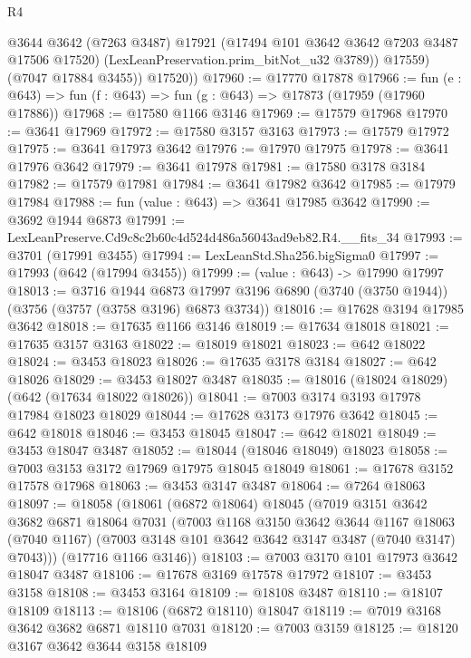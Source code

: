 \begin{lexlean}{R4}
\begin{coremodule}
              @3644
              @3642
              (@7263 @3487)
              @17921
              (@17494 @101 @3642 @3642 @7203 @3487 @17506 @17520)
              (LexLeanPreservation.prim_bitNot_u32 @3789))
            @17559)
          (@7047 @17884 @3455))
        @17520))
@17960 := @17770 @17878
@17966 := fun (e : @643) => fun (f : @643) => fun (g : @643) => @17873 (@17959 (@17960 @17886))
@17968 := @17580 @1166 @3146
@17969 := @17579 @17968
@17970 := @3641 @17969
@17972 := @17580 @3157 @3163
@17973 := @17579 @17972
@17975 := @3641 @17973 @3642
@17976 := @17970 @17975
@17978 := @3641 @17976 @3642
@17979 := @3641 @17978
@17981 := @17580 @3178 @3184
@17982 := @17579 @17981
@17984 := @3641 @17982 @3642
@17985 := @17979 @17984
@17988 := fun (value : @643) => @3641 @17985 @3642
@17990 := @3692 @1944 @6873
@17991 := LexLeanPreserve.Cd9c8c2b60c4d524d486a56043ad9eb82.R4.__fits_34
@17993 := @3701 (@17991 @3455)
@17994 := LexLeanStd.Sha256.bigSigma0
@17997 := @17993 (@642 (@17994 @3455))
@17999 := (value : @643) -> @17990 @17997
@18013 := @3716
    @1944
    @6873
    @17997
    @3196
    @6890
    (@3740 (@3750 @1944))
    (@3756 (@3757 (@3758 @3196) @6873 @3734))
@18016 := @17628 @3194 @17985 @3642
@18018 := @17635 @1166 @3146
@18019 := @17634 @18018
@18021 := @17635 @3157 @3163
@18022 := @18019 @18021
@18023 := @642 @18022
@18024 := @3453 @18023
@18026 := @17635 @3178 @3184
@18027 := @642 @18026
@18029 := @3453 @18027 @3487
@18035 := @18016 (@18024 @18029) (@642 (@17634 @18022 @18026))
@18041 := @7003 @3174 @3193 @17978 @17984 @18023 @18029
@18044 := @17628 @3173 @17976 @3642
@18045 := @642 @18018
@18046 := @3453 @18045
@18047 := @642 @18021
@18049 := @3453 @18047 @3487
@18052 := @18044 (@18046 @18049) @18023
@18058 := @7003 @3153 @3172 @17969 @17975 @18045 @18049
@18061 := @17678 @3152 @17578 @17968
@18063 := @3453 @3147 @3487
@18064 := @7264 @18063
@18097 := @18058
    (@18061
      (@6872 @18064)
      @18045
      (@7019
        @3151
        @3642
        @3682
        @6871
        @18064
        @7031
        (@7003
          @1168
          @3150
          @3642
          @3644
          @1167
          @18063
          (@7040 @1167)
          (@7003 @3148 @101 @3642 @3642 @3147 @3487 (@7040 @3147) @7043)))
      (@17716 @1166 @3146))
@18103 := @7003 @3170 @101 @17973 @3642 @18047 @3487
@18106 := @17678 @3169 @17578 @17972
@18107 := @3453 @3158
@18108 := @3453 @3164
@18109 := @18108 @3487
@18110 := @18107 @18109
@18113 := @18106 (@6872 @18110) @18047
@18119 := @7019 @3168 @3642 @3682 @6871 @18110 @7031
@18120 := @7003 @3159
@18125 := @18120 @3167 @3642 @3644 @3158 @18109

\end{coremodule}
\end{lexlean}
